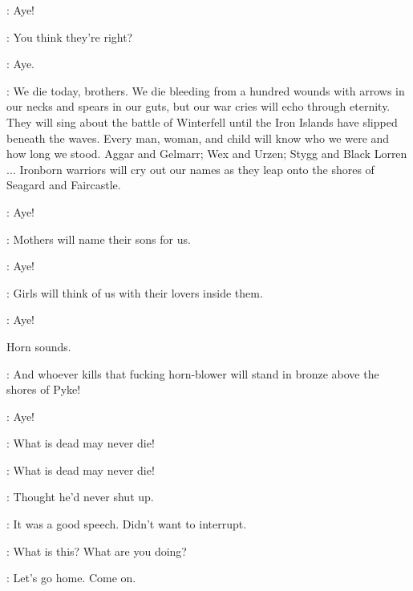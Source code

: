 \IRONBORN: Aye! 

\THEON: You think they're right? 

\IRONBORN: Aye. 

\THEON: We die today, brothers. We die bleeding from a hundred wounds with arrows in our necks and spears in our guts, but our war cries will echo through eternity. They will sing about the battle of Winterfell until the Iron Islands have slipped beneath the waves. Every man, woman, and child will know who we were and how long we stood. Aggar and Gelmarr; Wex and Urzen; Stygg and Black Lorren$\ldots$  Ironborn warriors will cry out our names as they leap onto the shores of Seagard and Faircastle. 


\IRONBORN: Aye! 

\THEON: Mothers will name their sons for us. 

\IRONBORN: Aye! 

\THEON: Girls will think of us with their lovers inside them. 

\IRONBORN: Aye! 

\sfx Horn sounds.

\THEON: And whoever kills that fucking horn-blower will stand in bronze above the shores of Pyke! 

\IRONBORN: Aye! 

\THEON: What is dead may never die! 

\IRONBORN: What is dead may never die! 



\LORREN: Thought he'd never shut up. 

\DAGMER: It was a good speech. Didn't want to interrupt. 


\LUWIN: What is this? What are you doing? 


\DAGMER:  Let's go home. Come on. 



\scene

